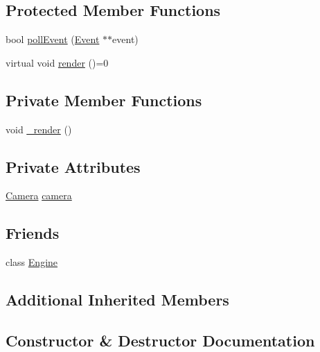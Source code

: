 \subsection*{Protected Member Functions}
\begin{DoxyCompactItemize}
\item 
bool \hyperlink{classpcs_1_1Scene_ab6c463fedfc6499998d55206aa9afeb9}{poll\+Event} (\hyperlink{classpcs_1_1Event}{Event} $\ast$$\ast$event)
\item 
virtual void \hyperlink{classpcs_1_1Scene_ad1ed5ae1d53a533e2970de85093a4bc4}{render} ()=0
\end{DoxyCompactItemize}
\subsection*{Private Member Functions}
\begin{DoxyCompactItemize}
\item 
void \hyperlink{classpcs_1_1Scene_ad5f0807caa705da2b3782ad4cf2619a8}{\+\_\+render} ()
\end{DoxyCompactItemize}
\subsection*{Private Attributes}
\begin{DoxyCompactItemize}
\item 
\hyperlink{classpcs_1_1Camera}{Camera} \hyperlink{classpcs_1_1Scene_ad71d97a418c46759bda1c84742ab9fd3}{camera}
\end{DoxyCompactItemize}
\subsection*{Friends}
\begin{DoxyCompactItemize}
\item 
class \hyperlink{classpcs_1_1Scene_a3e1914489e4bed4f9f23cdeab34a43dc}{Engine}
\end{DoxyCompactItemize}
\subsection*{Additional Inherited Members}


\subsection{Constructor \& Destructor Documentation}
\mbox{\label{classpcs_1_1Scene_a04a77b0c67dc42c11d5c50a07ab3a06f}} 
